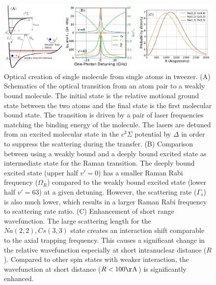 \documentclass[aps,prl,twocolumn,superscriptaddress]{revtex4-1}
\begin{document}
\begin{figure}
  \includegraphics[width=\textwidth]{fig1.pdf}
  \caption{Optical creation of single molecule from single atoms in tweezer.
    (A) Schematics of the optical transition from an atom pair to a weakly bound molecule.
    The initial state is the relative motional ground state between the two atoms
    and the final state is the first molecular bound state.
    The transition is driven by a pair of laser frequencies matching the binding energy
    of the molecule.
    The lasers are detuned from an excited molecular state in the $c^3\Sigma$ potential
    by $\Delta$ in order to suppress the scattering during the transfer.
    (B) Comparison between using a weakly bound and a deeply bound excited state
    as intermediate state for the Raman transition.
    The deeply bound excited state (upper half $v'=0$)
    has a smaller Raman Rabi frequency ($\Omega_{R}$)
    compared to the weakly bound excited state (lower half $v'=63$) at a given detuning.
    However, the scattering rate ($\Gamma_{s}$) is also much lower,
    which results in a larger Raman Rabi frequency to scattering rate ratio.
    (C) Enhancement of short range wavefunction.
    The large scattering length for the $Na(2,2),Cs(3,3)$ state creates an interaction shift
    comparable to the axial trapping frequency.
    This causes a significant change in the relative wavefunction especially at short
    intranuclear distance ($R$).
    Compared to other spin states with weaker interaction,
    the wavefunction at short distance ($R<100\mathrm{\AA}$) is significantly enhanced.
    \label{f-theory}
  }
\end{figure}





\end{document}
